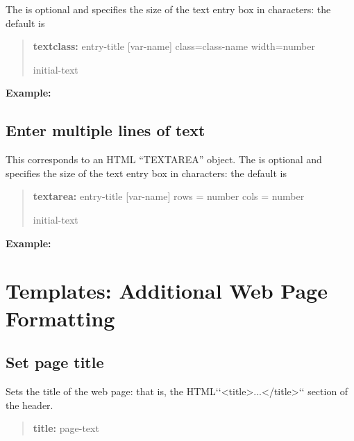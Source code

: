 \documentclass[letterpaper,10pt,english]{sphinxmanual}
\begin{document}
The  is optional and specifies the size of the text
entry box in characters: the default is 
\begin{quote}

\begin{DUlineblock}{0em}
\item[] \textbf{textclass:} entry-title {[}var-name{]} class=class-name
width=number
\item[] initial-text
\end{DUlineblock}
\end{quote}

\textbf{Example:}
\begin{quote}

\end{quote}


\subsection{Enter multiple lines of text}
\label{forms:enter-multiple-lines-of-text}
This corresponds to an HTML “TEXTAREA” object. The
 is optional and specifies the size of
the text entry box in characters: the default is 
\begin{quote}

\begin{DUlineblock}{0em}
\item[] \textbf{textarea:} entry-title {[}var-name{]} rows = number cols = number
\item[] initial-text
\end{DUlineblock}
\end{quote}

\textbf{Example:}
\begin{quote}

\end{quote}


\section{Templates: Additional Web Page Formatting}
\label{forms:templates-additional-web-page-formatting}

\subsection{Set page title}
\label{forms:set-page-title}
Sets the title of the web page: that is, the HTML{}`{}`\textless{}title\textgreater{}...\textless{}/title\textgreater{}{}`{}`
section of the header.
\begin{quote}

\begin{DUlineblock}{0em}
\item[] \textbf{title:} page-text
\end{DUlineblock}
\end{quote}
\end{document}
